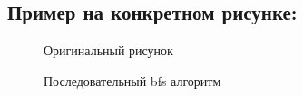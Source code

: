 \documentclass{report}
\begin{document}
\subsection*{Пример на конкретном рисунке:} 
\begin{figure}[H]
\caption{Оригинальный рисунок}
\end{figure}
\begin{figure}[H]
\caption{Последовательный bfs алгоритм}
\end{figure}
\end{document}
